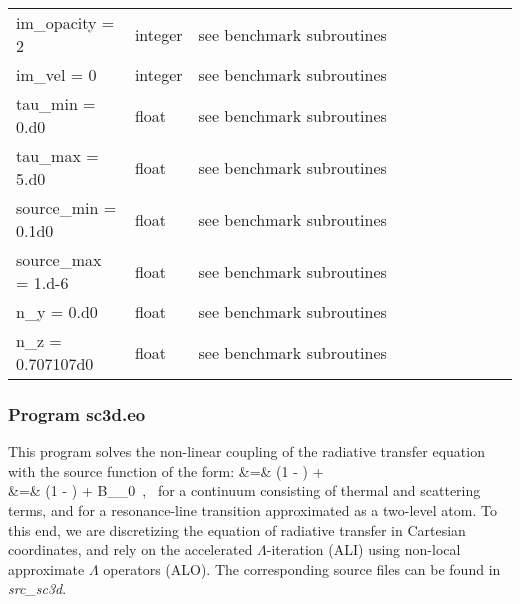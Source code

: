 \documentclass[10pt,a4paper]{article}
\begin{document}
\begin{footnotesize}
\begin{longtable}[h]{p{0.24\linewidth}p{0.07\linewidth}p{0.69\linewidth}}
im\_opacity = 2 & integer & see benchmark subroutines \\
im\_vel = 0 & integer & see benchmark subroutines \\
tau\_min = 0.d0 & float & see benchmark subroutines \\
tau\_max = 5.d0 & float & see benchmark subroutines \\
source\_min = 0.1d0 & float & see benchmark subroutines \\
source\_max = 1.d-6 & float & see benchmark subroutines \\
n\_y = 0.d0 & float & see benchmark subroutines \\
n\_z = 0.707107d0 & float & see benchmark subroutines
\end{longtable}
\end{footnotesize}

\subsubsection{Program sc3d.eo}
This program solves the non-linear coupling of the radiative transfer equation with the source function of the form:
\beqa
\scont &=& \left(1 - \epsc \right) \Jnu + \epsc \Bnu \\
\sline &=& \left(1 - \epsl \right) \Jbar + \epsl B_{\nu_0} \,,
\eeqa
\ie~for a continuum consisting of thermal and scattering terms, and
for a resonance-line transition approximated as a two-level atom.
To this end, we are discretizing the equation of radiative transfer in
Cartesian coordinates, and rely on the accelerated $\Lambda$-iteration (ALI)
using non-local approximate $\Lambda$ operators (ALO). The
corresponding source files can be found in \textit{src\_sc3d}.
\end{document}
